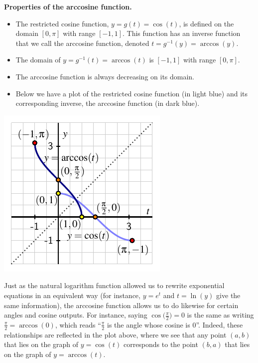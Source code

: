 \documentclass{ximera}
\begin{document}
\begin{callout}{\bf Properties of the arccosine function.}%
\begin{itemize}
\item
The restricted cosine function, $y = g(t) = \cos(t)$, is defined on the domain $[0,\pi]$ with range $[-1,1]$.  This function has an inverse function that we call the arccosine function, denoted $t = g^{-1}(y) = \arccos(y)$.%
\item
The domain of $y = g^{-1}(t) = \arccos(t)$ is $[-1,1]$ with range $[0,\pi]$.%
\item
The arccosine function is always decreasing on its domain.%
\item
Below we have a plot of the restricted cosine function (in light blue) and its corresponding inverse, the arccosine function (in dark blue).%
\end{itemize}
\includegraphics[width=1\linewidth]{inverse-trig-arccos-graph.pdf}
\end{callout}

Just as the natural logarithm function allowed us to rewrite exponential equations in an equivalent way (for instance, $y = e^t$ and $t = \ln(y)$ give the same information), the arccosine function allows us to do likewise for certain angles and cosine outputs.  For instance, saying $\cos\big(\frac{\pi}{2}\big) = 0$ is the same as writing $\frac{\pi}{2} = \arccos(0)$, which reads ``$\frac{\pi}{2}$ is the angle whose cosine is $0$''.  Indeed, these relationships are reflected in the plot above, where we see that any point $(a,b)$ that lies on the graph of $y = \cos(t)$ corresponds to the point $(b,a)$ that lies on the graph of $y = \arccos(t)$.%
\end{document}

